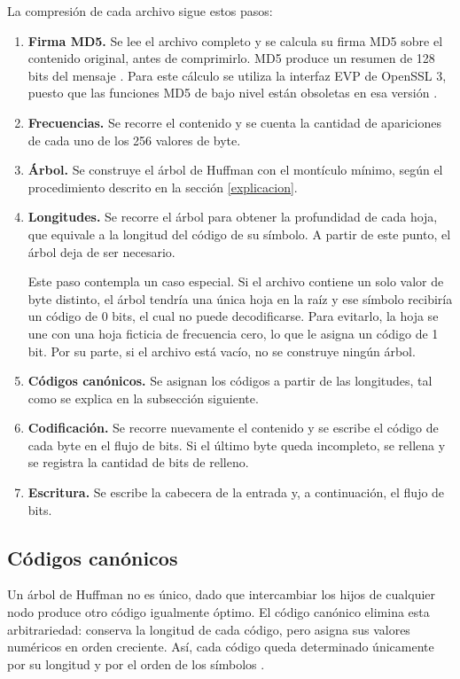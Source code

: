\documentclass{report}
\begin{document}
La compresión de cada archivo sigue estos pasos:

\begin{enumerate}
    \item \textbf{Firma MD5.} Se lee el archivo completo y se calcula su firma MD5 sobre el contenido original, antes de comprimirlo. MD5 produce un resumen de 128 bits del mensaje \cite{rfc1321}. Para este cálculo se utiliza la interfaz EVP de OpenSSL 3, puesto que las funciones MD5 de bajo nivel están obsoletas en esa versión \cite{openssl35}.
    \item \textbf{Frecuencias.} Se recorre el contenido y se cuenta la cantidad de apariciones de cada uno de los 256 valores de byte.
    \item \textbf{Árbol.} Se construye el árbol de Huffman con el montículo mínimo, según el procedimiento descrito en la sección \ref{explicacion}.
    \item \textbf{Longitudes.} Se recorre el árbol para obtener la profundidad de cada hoja, que equivale a la longitud del código de su símbolo. A partir de este punto, el árbol deja de ser necesario.

    Este paso contempla un caso especial. Si el archivo contiene un solo valor de byte distinto, el árbol tendría una única hoja en la raíz y ese símbolo recibiría un código de 0 bits, el cual no puede decodificarse. Para evitarlo, la hoja se une con una hoja ficticia de frecuencia cero, lo que le asigna un código de 1 bit. Por su parte, si el archivo está vacío, no se construye ningún árbol.
    \item \textbf{Códigos canónicos.} Se asignan los códigos a partir de las longitudes, tal como se explica en la subsección siguiente.
    \item \textbf{Codificación.} Se recorre nuevamente el contenido y se escribe el código de cada byte en el flujo de bits. Si el último byte queda incompleto, se rellena y se registra la cantidad de bits de relleno.
    \item \textbf{Escritura.} Se escribe la cabecera de la entrada y, a continuación, el flujo de bits.
\end{enumerate}

\subsection{Códigos canónicos}

Un árbol de Huffman no es único, dado que intercambiar los hijos de cualquier nodo produce otro código igualmente óptimo. El código canónico elimina esta arbitrariedad: conserva la longitud de cada código, pero asigna sus valores numéricos en orden creciente. Así, cada código queda determinado únicamente por su longitud y por el orden de los símbolos \cite{schwartz64}.
\end{document}
